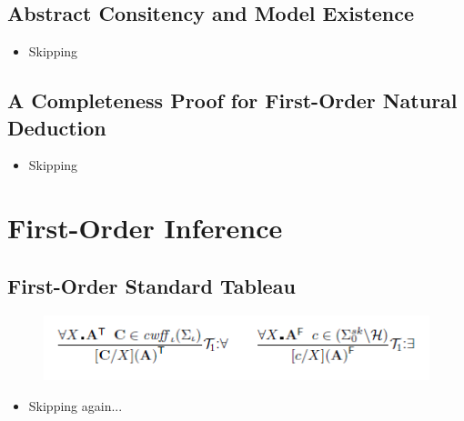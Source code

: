 \documentclass{scrartcl}
\begin{document}
\subsection{Abstract Consitency and Model Existence}
\begin{itemize}
    \item
        Skipping
\end{itemize}
\subsection{A Completeness Proof for First-Order Natural Deduction}
\begin{itemize}
    \item
        Skipping
\end{itemize}
\section{First-Order Inference}
\subsection{First-Order Standard Tableau}
\begin{figure}[H]
            \centering
            \includegraphics[scale=1]{figures/426}
\end{figure} 
\begin{itemize}
    \item
        Skipping again...
\end{itemize}
\end{document}
